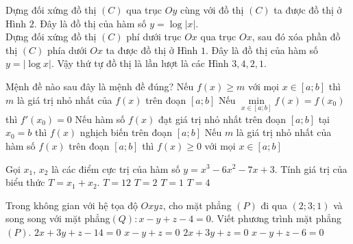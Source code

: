 \begin{ex}
{{\begin{tikzpicture}[scale=.6,thick]
	\end{tikzpicture}
}
\noindent  Dựng đối xứng đồ thị $(C)$ qua trục $Oy$ cùng với đồ thị $(C)$ ta được đồ thị ở Hình $2$. Đây là đồ thị của hàm số    $y = \log|x|$.\\
 Dựng đối xứng đồ thị $(C)$ phí dưới trục $Ox$ qua trục $Ox$, sau đó xóa phần đồ thị $(C)$ phía dưới $Ox$ ta được đồ thị ở Hình $1$. Đây là đồ thị của hàm số    $y = |\log x|$.
Vậy thứ tự đồ thị là  lần lượt là các Hình $3,4,2,1$.
}
	
\end{ex}
\begin{ex}%
Mệnh đề nào sau đây là mệnh đề đúng?
\choice
{Nếu $f(x) \ge m$ với mọi $x \in [a;b]$ thì $m$ là giá trị nhỏ nhất của $f(x)$ trên đoạn $[a;b]$}
{Nếu $\underset{x \in [a;b]}{\min}f(x)= f(x_0)$ thì $f'(x_0) = 0$}
{Nếu hàm số  $f(x)$  đạt giá trị nhỏ  nhất trên đoạn $[a;b]$   tại $x_0=b$ thì $f(x)$   nghịch biến trên đoạn $[a;b]$}
{\True Nếu  $m$   là giá trị nhỏ  nhất của hàm số  $f(x)$   trên đoạn  $[a;b]$  thì  $f(x) \ge 0$ với mọi $x \in [a;b]$}
\end{ex}

\begin{ex}%
Gọi $x_1$, $x_2$ là các điểm cực trị của hàm số $y=x^3-6x^2-7x+3$. Tính giá trị của biểu thức $T=x_1+x_2$.
\choice
{$T=12$}
{$T=2$}
{$T=1$}
{\True $T=4$}
\end{ex}

\begin{ex}%
Trong không gian với hệ  tọa độ  $Oxyz$, cho mặt phẳng $(P)$ đi qua $ (2; 3; 1) $   và song song với mặt phẳng$(Q): x-y+z-4=0$. Viết  phương trình mặt phẳng $(P)$.  
\choice
{$2x+3y+z-14 = 0$}
{\True $x-y+z=0$}
{$2x+3y+z = 0$}
{$x-y+z-6 = 0$}
\end{ex}

